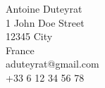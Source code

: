 
Antoine Duteyrat \\
1 John Doe Street \\
12345 City \\
France \\
aduteyrat@gmail.com \\
+33 6 12 34 56 78